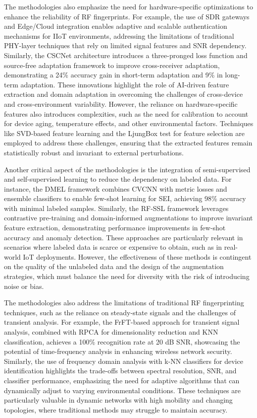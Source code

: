 \documentclass[conference]{IEEEtran}
\begin{document}
The methodologies also emphasize the need for hardware-specific optimizations to enhance the reliability of RF fingerprints. For example, the use of SDR gateways and Edge/Cloud integration enables adaptive and scalable authentication mechanisms for IIoT environments, addressing the limitations of traditional PHY-layer techniques that rely on limited signal features and SNR dependency. Similarly, the CSCNet architecture introduces a three-pronged loss function and source-free adaptation framework to improve cross-receiver adaptation, demonstrating a 24\% accuracy gain in short-term adaptation and 9\% in long-term adaptation. These innovations highlight the role of AI-driven feature extraction and domain adaptation in overcoming the challenges of cross-device and cross-environment variability. However, the reliance on hardware-specific features also introduces complexities, such as the need for calibration to account for device aging, temperature effects, and other environmental factors. Techniques like SVD-based feature learning and the LjungBox test for feature selection are employed to address these challenges, ensuring that the extracted features remain statistically robust and invariant to external perturbations.  

Another critical aspect of the methodologies is the integration of semi-supervised and self-supervised learning to reduce the dependency on labeled data. For instance, the DMEL framework combines CVCNN with metric losses and ensemble classifiers to enable few-shot learning for SEI, achieving 98\% accuracy with minimal labeled samples. Similarly, the RF-SSL framework leverages contrastive pre-training and domain-informed augmentations to improve invariant feature extraction, demonstrating performance improvements in few-shot accuracy and anomaly detection. These approaches are particularly relevant in scenarios where labeled data is scarce or expensive to obtain, such as in real-world IoT deployments. However, the effectiveness of these methods is contingent on the quality of the unlabeled data and the design of the augmentation strategies, which must balance the need for diversity with the risk of introducing noise or bias.  

The methodologies also address the limitations of traditional RF fingerprinting techniques, such as the reliance on steady-state signals and the challenges of transient analysis. For example, the FrFT-based approach for transient signal analysis, combined with RPCA for dimensionality reduction and KNN classification, achieves a 100\% recognition rate at 20 dB SNR, showcasing the potential of time-frequency analysis in enhancing wireless network security. Similarly, the use of frequency domain analysis with k-NN classifiers for device identification highlights the trade-offs between spectral resolution, SNR, and classifier performance, emphasizing the need for adaptive algorithms that can dynamically adjust to varying environmental conditions. These techniques are particularly valuable in dynamic networks with high mobility and changing topologies, where traditional methods may struggle to maintain accuracy.  
\end{document}
